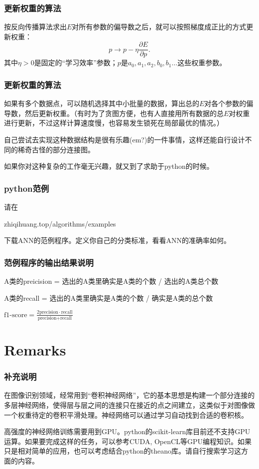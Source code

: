 \documentclass[CJK]{beamer}
\begin{document}
  \begin{frame}
    \frametitle{更新权重的算法}
    按反向传播算法求出$E$对所有参数的偏导数之后，就可以按照梯度成正比的方式更新权重：
    $$ p \rightarrow p - \eta\frac{\partial E}{\partial p}. $$
    其中$\eta>0$是固定的“学习效率”参数；$p$是$a_0,a_1,a_2,b_0,b_1\ldots$这些权重参数。
  \end{frame}


  \begin{frame}
    \frametitle{更新权重的算法}
    如果有多个数据点，可以随机选择其中小批量的数据，算出总的$E$对各个参数的偏导数，然后更新权重。（有时为了贪图方便，也有人直接用所有数据的总$E$对权重进行更新，不过这样计算速度慢，也容易发生锁死在局部最优的情况。）
  \end{frame}
  
  
  \begin{frame}
    自己尝试去实现这种数据结构是很有乐趣(em?)的一件事情，这样还能自行设计不同的稀奇古怪的部分连接图。

    \skiplines

    如果你对这种复杂的工作毫无兴趣，就又到了求助于python的时候。
    
  \end{frame}
  

  \begin{frame}
    \frametitle{python范例}
    请在
    
    zhiqihuang.top/algorithms/examples

    下载ANN的范例程序。定义你自己的分类标准，看看ANN的准确率如何。
  \end{frame}


  \begin{frame}
    \frametitle{范例程序的输出结果说明}
    \emini
    A类的preicision = 选出的A类里确实是A类的个数 / 选出的A类总个数

    \skipline
    
    A类的recall = 选出的A类里确实是A类的个数 / 确实是A类的总个数

    \skipline
    
    $\text{f1-score} = \frac{2\text{precision}\cdot\text{recall}}{\text{precision} + \text{recall}}$
    \emini
  \end{frame}

  \section{Remarks}
  
  \begin{frame}
    \frametitle{补充说明}
    \bitem
  \item{在图像识别领域，经常用到“卷积神经网络”，它的基本思想是构建一个部分连接的多层神经网络，使得层与层之间的连接只在接近的点之间建立，这类似于对图像做一个权重待定的卷积平滑处理。神经网络可以通过学习自动找到合适的卷积核。}
  \item{高强度的神经网络训练需要用到GPU。python的scikit-learn库目前还不支持GPU运算。如果要完成这样的任务，可以参考CUDA, OpenCL等GPU编程知识。如果只是相对简单的应用，也可以考虑结合python的theano库。请自行搜索学习这方面的内容。}
    \eitem
  \end{frame}
  
  \ech
\end{document}

